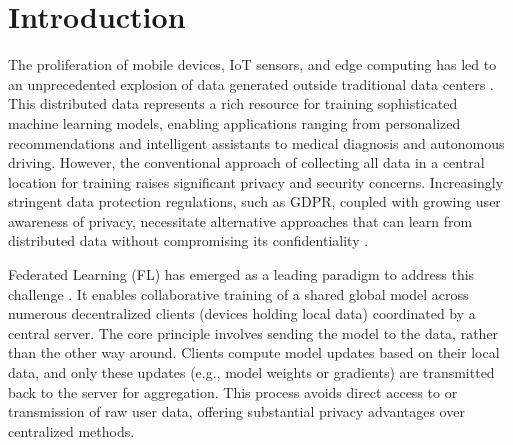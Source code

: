 \documentclass[conference]{IEEEtran}
\begin{document}
\IEEEpeerreviewmaketitle


\section{Introduction}
The proliferation of mobile devices, IoT sensors, and edge computing has led to an unprecedented explosion of data generated outside traditional data centers \cite{b21}. This distributed data represents a rich resource for training sophisticated machine learning models, enabling applications ranging from personalized recommendations and intelligent assistants to medical diagnosis and autonomous driving. However, the conventional approach of collecting all data in a central location for training raises significant privacy and security concerns. Increasingly stringent data protection regulations, such as GDPR, coupled with growing user awareness of privacy, necessitate alternative approaches that can learn from distributed data without compromising its confidentiality \cite{b1}.

Federated Learning (FL) has emerged as a leading paradigm to address this challenge \cite{b2, b22}. It enables collaborative training of a shared global model across numerous decentralized clients (devices holding local data) coordinated by a central server. The core principle involves sending the model to the data, rather than the other way around. Clients compute model updates based on their local data, and only these updates (e.g., model weights or gradients) are transmitted back to the server for aggregation. This process avoids direct access to or transmission of raw user data, offering substantial privacy advantages over centralized methods. 
\end{document}
